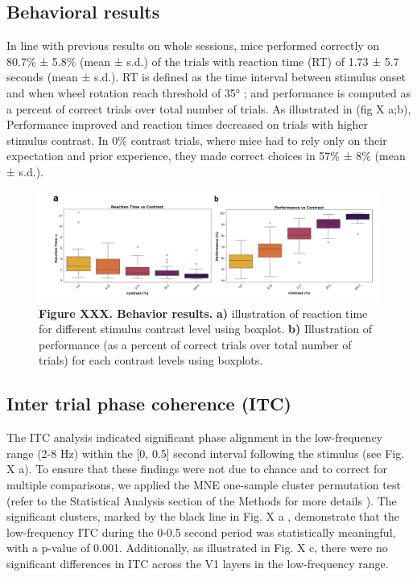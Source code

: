 \documentclass[
  letterpaper,
  DIV=11,
  numbers=noendperiod]{scrartcl}
\begin{document}
\subsection{\texorpdfstring{Behavioral results
}{Behavioral results }}\label{behavioral-results}

In line with previous results on whole sessions, mice performed
correctly on 80.7\% ± 5.8\% (mean ± s.d.) of the trials with reaction
time (RT) of 1.73 ± 5.7 seconds (mean ± s.d.). RT is defined as the time
interval between stimulus onset and when wheel rotation reach threshold
of 35° ; and performance is computed as a percent of correct trials over
total number of trials. As illustrated in (fig X a;b), Performance
improved and reaction times decreased on trials with higher stimulus
contrast. In 0\% contrast trials, where mice had to rely only on their
expectation and prior experience, they made correct choices in 57\% ±
8\% (mean ± s.d.).

\begin{figure}[H]

{\centering \includegraphics{images/behavioral.png}

}

\caption{\textbf{Figure XXX. Behavior results.} \textbf{a)} illustration
of reaction time for different stimulus contrast level using boxplot.
\textbf{b)} Illustration of performance (as a percent of correct trials
over total number of trials) for each contrast levels using boxplots. }

\end{figure}%

\subsection{Inter trial phase coherence
(ITC)}\label{inter-trial-phase-coherence-itc-1}

The ITC analysis indicated significant phase alignment in the
low-frequency range (2-8 Hz) within the {[}0, 0.5{]} second interval
following the stimulus (see Fig. X a). To ensure that these findings
were not due to chance and to correct for multiple comparisons, we
applied the MNE one-sample cluster permutation test (refer to the
Statistical Analysis section of the Methods for more details ). The
significant clusters, marked by the black line in Fig. X a , demonstrate
that the low-frequency ITC during the 0-0.5 second period was
statistically meaningful, with a p-value of 0.001. Additionally, as
illustrated in Fig. X c, there were no significant differences in ITC
across the V1 layers in the low-frequency range.
\end{document}
